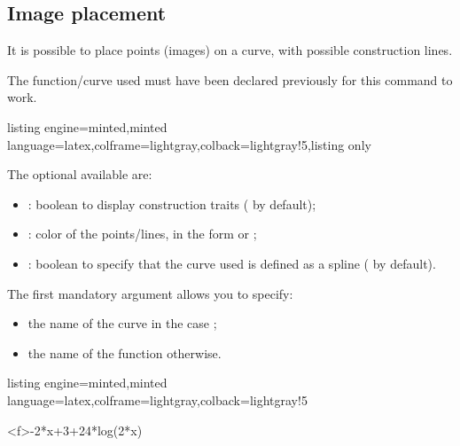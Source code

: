 \documentclass[11pt,a4paper]{ltxdoc}
\begin{document}
\subsection{Image placement}\label{images}

It is possible to place points (images) on a curve, with possible construction lines.

The function/curve used must have been declared previously for this command to work.

\begin{tcblisting}{listing engine=minted,minted language=latex,colframe=lightgray,colback=lightgray!5,listing only}
\end{tcblisting}

The optional \MontreCode{[keys]} available are:

\smallskip

\begin{itemize}
	\item {}: boolean to display construction traits ( by default);
	\item {}: color of the points/lines, in the form  or ;
	\item {}: boolean to specify that the curve used is defined as a \textsf{spline} ( by default).
\end{itemize}

\smallskip

The first mandatory argument allows you to specify:

\smallskip

\begin{itemize}
	\item the name of the curve in the case ;
	\item the name of the function otherwise.
\end{itemize}

\begin{tcblisting}{listing engine=minted,minted language=latex,colframe=lightgray,colback=lightgray!5}
\begin{GraphTikz}%
	[x=0.9cm,y=0.425cm,Xmin=4,Xmax=20,Origx=4,
	Ymin=40,Ymax=56,Ygrid=2,Ygrids=1,Origy=40]
	{-2*x+3+24*log(2*x)}
\end{GraphTikz}
\end{tcblisting}
\end{document}

